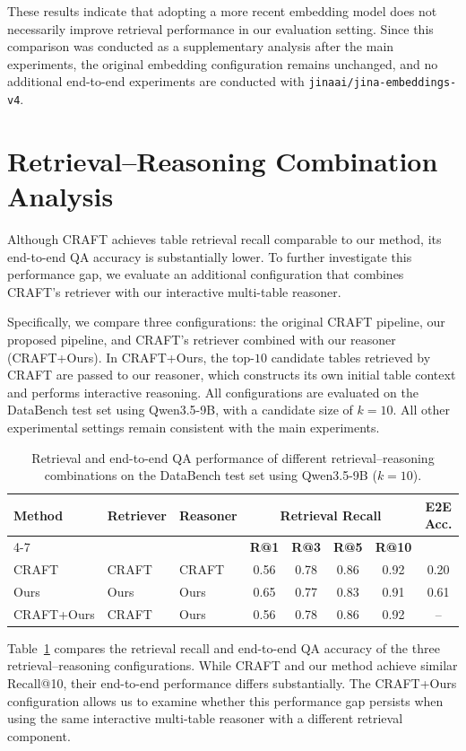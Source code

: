 These results indicate that adopting a more recent embedding model does not necessarily improve retrieval performance in our evaluation setting.
Since this comparison was conducted as a supplementary analysis after the main experiments, the original embedding configuration remains unchanged, and no additional end-to-end experiments are conducted with \texttt{jinaai/jina-embeddings-v4}.


\section{Retrieval--Reasoning Combination Analysis}
\label{sec:retrieval_reasoning_combination}

Although CRAFT achieves table retrieval recall comparable to our method, its end-to-end QA accuracy is substantially lower. To further investigate this performance gap, we evaluate an additional configuration that combines CRAFT's retriever with our interactive multi-table reasoner.

Specifically, we compare three configurations: the original CRAFT pipeline, our proposed pipeline, and CRAFT's retriever combined with our reasoner (CRAFT+Ours). In CRAFT+Ours, the top-$10$ candidate tables retrieved by CRAFT are passed to our reasoner, which constructs its own initial table context and performs interactive reasoning. All configurations are evaluated on the DataBench test set using Qwen3.5-9B, with a candidate size of $k=10$. All other experimental settings remain consistent with the main experiments.


\begin{table}[t]
\centering
\caption{Retrieval and end-to-end QA performance of different retrieval--reasoning combinations on the DataBench test set using Qwen3.5-9B ($k=10$).}
\label{tab:retrieval_reasoning_combination}
\small
\begin{tabular}{lllccccc}
\toprule
\textbf{Method} &
\textbf{Retriever} &
\textbf{Reasoner} &
\multicolumn{4}{c}{\textbf{Retrieval Recall}} &
\textbf{E2E Acc.} \\
\cmidrule(lr){4-7}
& & &
\textbf{R@1} &
\textbf{R@3} &
\textbf{R@5} &
\textbf{R@10} & \\
\midrule
CRAFT
& CRAFT & CRAFT
& 0.56 & 0.78 & 0.86 & 0.92 & 0.20 \\
Ours
& Ours & Ours
& 0.65 & 0.77 & 0.83 & 0.91 & 0.61 \\
CRAFT+Ours
& CRAFT & Ours
& 0.56 & 0.78 & 0.86 & 0.92 & -- \\
\bottomrule
\end{tabular}
\end{table}


Table~\ref{tab:retrieval_reasoning_combination} compares the retrieval recall and end-to-end QA accuracy of the three retrieval--reasoning configurations. While CRAFT and our method achieve similar Recall@10, their end-to-end performance differs substantially. The CRAFT+Ours configuration allows us to examine whether this performance gap persists when using the same interactive multi-table reasoner with a different retrieval component.

